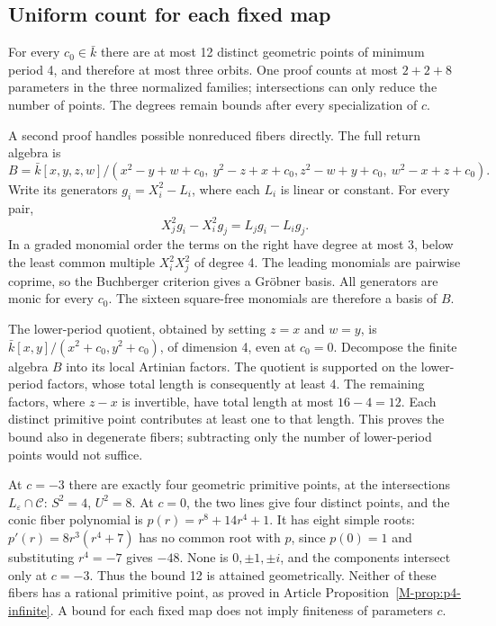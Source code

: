 \documentclass{jT}
\begin{document}
\subsection{Uniform count for each fixed map}
For every $c_0\in\bar k$ there are at most 12 distinct geometric points of minimum period 4, and therefore at most three orbits. One proof counts at most $2+2+8$ parameters in the three normalized families; intersections can only reduce the number of points. The degrees remain bounds after every specialization of $c$.

A second proof handles possible nonreduced fibers directly. The full return algebra is
\[
B=\bar k[x,y,z,w]/(x^2-y+w+c_0,\ y^2-z+x+c_0,
 z^2-w+y+c_0,\ w^2-x+z+c_0).
\]
Write its generators $g_i=X_i^2-L_i$, where each $L_i$ is linear or constant. For every pair,
\[
X_j^2g_i-X_i^2g_j=L_jg_i-L_ig_j.
\]
In a graded monomial order the terms on the right have degree at most 3, below the least common multiple $X_i^2X_j^2$ of degree 4. The leading monomials are pairwise coprime, so the Buchberger criterion \cite[Theorem 2.1.8]{winkler} gives a Gr\"obner basis. All generators are monic for every $c_0$. The sixteen square-free monomials are therefore a basis of $B$.

The lower-period quotient, obtained by setting $z=x$ and $w=y$, is $\bar k[x,y]/(x^2+c_0,y^2+c_0)$, of dimension 4, even at $c_0=0$. Decompose the finite algebra $B$ into its local Artinian factors. The quotient is supported on the lower-period factors, whose total length is consequently at least 4. The remaining factors, where $z-x$ is invertible, have total length at most $16-4=12$. Each distinct primitive point contributes at least one to that length. This proves the bound also in degenerate fibers; subtracting only the number of lower-period points would not suffice.

At $c=-3$ there are exactly four geometric primitive points, at the intersections $L_\varepsilon\cap\mathcal C$: $S^2=4$, $U^2=8$. At $c=0$, the two lines give four distinct points, and the conic fiber polynomial is $p(r)=r^8+14r^4+1$. It has eight simple roots: $p'(r)=8r^3(r^4+7)$ has no common root with $p$, since $p(0)=1$ and substituting $r^4=-7$ gives $-48$. None is $0,\pm1,\pm i$, and the components intersect only at $c=-3$. Thus the bound 12 is attained geometrically. Neither of these fibers has a rational primitive point, as proved in Article Proposition~\ref{M-prop:p4-infinite}. A bound for each fixed map does not imply finiteness of parameters $c$.
\end{document}
